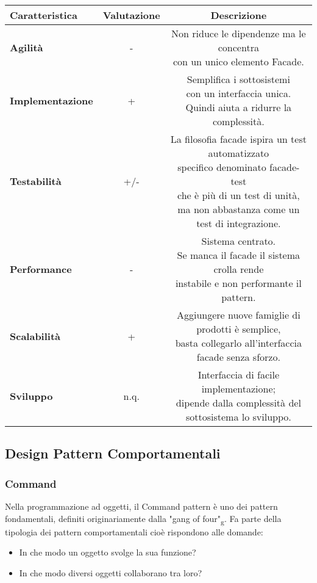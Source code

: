 {{{\begin{itemize}
				\small %
				{\renewcommand\arraystretch{1.2} %
					\begin{tabular}{|l|c|c|}
						\hline
						{\textbf{Caratteristica}}&{\textbf{Valutazione}}&{\textbf{Descrizione}}\\
						\hline
						\textbf{Agilità} & - &  \minitab[c]{Non riduce le dipendenze ma le concentra\\ con un unico elemento Facade.} \\
						\hline
						\textbf{Implementazione} & + &  \minitab[c]{Semplifica i sottosistemi\\ con un interfaccia unica.\\Quindi aiuta a ridurre la complessità.}  \\
						\hline
						\textbf{Testabilità} & +/- &  \minitab[c]{La filosofia facade ispira un test automatizzato\\specifico denominato facade-test\\che è più di un test di unità,\\ma non abbastanza come un test di integrazione.} \\
						\hline
						\textbf{Performance} & - & \minitab[c]{Sistema centrato.\\Se manca il facade il sistema crolla rende\\instabile e non performante il pattern.}\\
						\hline
						\textbf{Scalabilità} & + & \minitab[c]{Aggiungere nuove famiglie di prodotti è semplice,\\basta collegarlo all'interfaccia facade senza sforzo.}\\
						\hline
						\textbf{Sviluppo} & n.q. &  \minitab[c]{Interfaccia di facile implementazione;\\dipende dalla complessità del sottosistema lo sviluppo.}\\
						\hline
					\end{tabular}
				}
			\end{itemize}
		}
	}
	\subsection{Design Pattern Comportamentali}{
		\subsubsection{Command}{
			Nella programmazione ad oggetti, il Command pattern è uno dei pattern fondamentali, definiti originariamente dalla "gang of four"\textsubscript{g}. Fa parte della tipologia dei pattern comportamentali cioè rispondono alle domande: 
			\begin{itemize}
				\item In che modo un oggetto svolge la sua funzione?
				\item In che modo diversi oggetti collaborano tra loro?
			\end{itemize}
		
}}}
